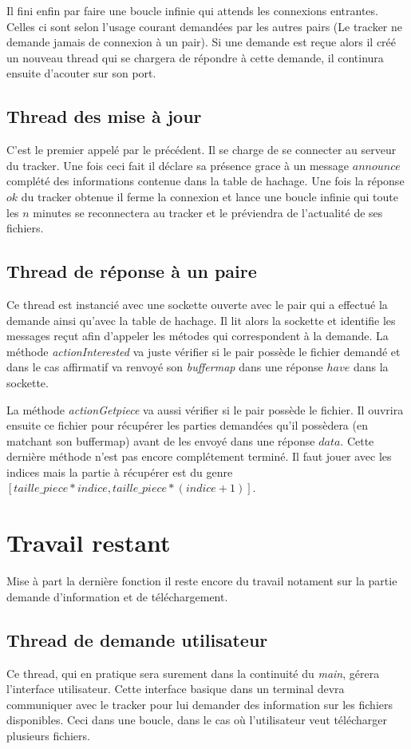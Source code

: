 Il fini enfin par faire une boucle infinie qui attends les connexions entrantes. Celles ci sont selon l'usage courant demandées par les autres pairs (Le tracker ne demande jamais de connexion à un pair). Si une demande est reçue alors il créé un nouveau thread qui se chargera de répondre à cette demande, il continura ensuite d'acouter sur son port.

\subsection*{Thread des mise à jour}
C'est le premier appelé par le précédent. Il se charge de se connecter au serveur du tracker. Une fois ceci fait il déclare sa présence grace à un message $announce$ complété des informations contenue dans la table de hachage. 
Une fois la réponse $ok$ du tracker obtenue il ferme la connexion et lance une boucle infinie qui toute les $n$ minutes se reconnectera au tracker et le préviendra de l'actualité de ses fichiers. 

\subsection*{Thread de réponse à un paire}
Ce thread est instancié avec une sockette ouverte avec le pair qui a effectué la demande ainsi qu'avec la table de hachage. Il lit alors la sockette et identifie les messages reçut afin d'appeler les métodes qui correspondent à la demande. La méthode \textit{actionInterested} va juste vérifier si le pair possède le fichier demandé et dans le cas affirmatif va renvoyé son \textit{buffermap} dans une réponse $have$ dans la sockette.

La méthode \textit{actionGetpiece} va aussi vérifier si le pair possède le fichier. Il ouvrira ensuite ce fichier pour récupérer les parties demandées qu'il possèdera (en matchant son buffermap) avant de les envoyé dans une réponse $data$.
Cette dernière méthode n'est pas encore complétement terminé. Il faut jouer avec les indices mais la partie à récupérer est du genre $[taille\_piece*indice,taille\_piece*(indice+1)]$.


\section{Travail restant}
Mise à part la dernière fonction il reste encore du travail notament sur la partie demande d'information et de téléchargement.

\subsection*{Thread de demande utilisateur} 
Ce thread, qui en pratique sera surement dans la continuité du \textit{main}, gérera l'interface utilisateur. Cette interface basique dans un terminal devra communiquer avec le tracker pour lui demander des information sur les fichiers disponibles. Ceci dans une boucle, dans le cas où l'utilisateur veut télécharger plusieurs fichiers.

